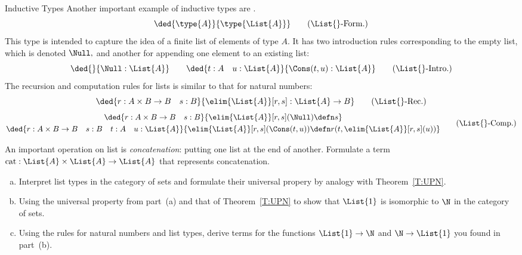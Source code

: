 \begin{unit}{Inductive Types}
Another important example of inductive types are .
\[\ded{\type{A}}{\type{\List{A}}} \tag{$\List{}$-Form.}\]
This type is intended to capture the idea of a finite list of elements of type \(A.\)
It has two introduction rules corresponding to the empty list, which is denoted \(\Null,\) and another for appending one element to an existing list:
\[\ded{}{\Null : \List{A}} \qquad \ded{t : A \quad u : \List{A}}{\Cons(t,u) : \List{A}} \tag{$\List{}$-Intro.}\]
The recursion and computation rules for lists is similar to that for natural numbers:
\[\ded{r:A \times B \to B \quad s:B}{\elim{\List{A}}[r,s]:\List{A}\to B} \tag{$\List{}$-Rec.}\]
\[\begin{gathered}
\ded{r:A \times B \to B \quad s:B}{\elim{\List{A}}[r,s](\Null) \defn s} \\  
\ded{r:A \times B \to B \quad s:B \quad t : A \quad u:\List{A}}{\elim{\List{A}}[r,s](\Cons(t,u)) \defn r(t,\elim{\List{A}}[r,s](u))}
\end{gathered} \tag{$\List{}$-Comp.}\]

\begin{problem}
  An important operation on list is \emph{concatenation}: putting one list at the end of another.
  Formulate a term \(\operatorname{cat}:\List{A}\times\List{A} \to \List{A}\) that represents concatenation.
\end{problem}

\begin{problem}\mbox{}   
  \begin{enumerate}[(a)]
  \item Interpret list types in the category of sets and formulate their universal propery by analogy with Theorem~\ref{T:UPN}.
  \item Using the universal property from part~(a) and that of Theorem~\ref{T:UPN} to show that \(\List{1}\) is isomorphic to \(\N\) in the category of sets.
  \item Using the rules for natural numbers and list types, derive terms for the functions \(\List{1} \to \N\) and \(\N \to \List{1}\) you found in part~(b).
  \end{enumerate}
\end{problem}

\end{unit}
\endinput
